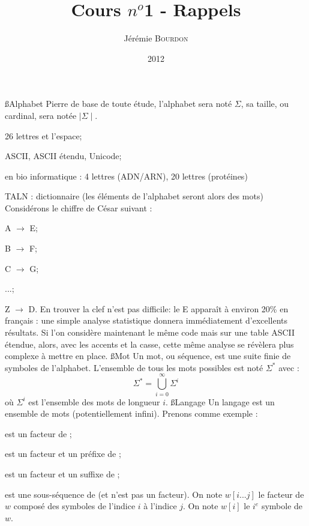 \documentclass[a4paper,11pt]{article}
\begin{document}
\title{Cours $n^o$1 - Rappels}
\author{Jérémie \textsc{Bourdon}}
\date{2012}
\maketitle
{}
 \ss{Alphabet}
  \p Pierre de base de toute étude, l'alphabet sera noté $\Sigma$, sa
  taille, ou cardinal, sera notée $\mid\Sigma\mid$.
  \bi
   \item 26 lettres et l'espace;
   \item ASCII, ASCII étendu, Unicode;
   \item en bio informatique : 4 lettres (ADN/ARN), 20 lettres (protéines)
   \item TALN : dictionnaire (les éléments de l'alphabet seront alors des mots)
  \ei
  \p Considérons le chiffre de César suivant :\\
  \bi
   \item A $\rightarrow$ E;
   \item B $\rightarrow$ F;
   \item C $\rightarrow$ G;
   \item ...;
   \item Z $\rightarrow$ D.
  \ei
  \p En trouver la clef n'est pas difficile: le E apparaît à environ 20\%{} en
  français : une simple analyse statistique donnera immédiatement
  d'excellents résultats. Si l'on considère maintenant le même code mais sur une
  table ASCII étendue, alors, avec les accents et la casse, cette même analyse se
  révèlera plus complexe à mettre en place.
 \ss{Mot}
 \p Un mot, ou séquence, est une suite finie de symboles de l'alphabet. L'ensemble
 de tous les mots possibles est noté $\Sigma^*$ avec :
 \[
 \Sigma^* = \bigcup^{\infty}_{i = 0} \Sigma^i
 \]
 où $\Sigma^i$ est l'ensemble des mots de longueur $i$.
 \ss{Langage}
 \p Un langage est un ensemble de mots (potentiellement infini).
 \p Prenons comme exemple  :\\
 \bi
  \item {} est un facteur de ;
  \item {} est un facteur et un préfixe de ;
  \item {} est un facteur et un suffixe de ;
  \item {} est une sous-séquence de  (et n'est pas un facteur).
 \ei
 \p On note $w[i...j]$ le facteur de $w$ composé des symboles de l'indice $i$ à
 l'indice $j$. On note $w[i]$ le $i^{e}$ symbole de $w$.
\end{document}
